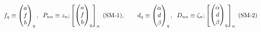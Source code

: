 \documentclass[preview]{standalone}
\begin{document}
\begin{align*}
\special{dvisvgm:raw <g id='unique000'>}f_q \equiv \begin{pmatrix} a \\ f \\ b \end{pmatrix}_q,\;\; P_{nn} \equiv z_n; \begin{bmatrix}\begin{pmatrix} a \\ f \\ b \end{pmatrix}_q\end{bmatrix}_n\;(\text{SM-1}), \qquad d_q \equiv \begin{pmatrix} \alpha \\ d \\ \beta \end{pmatrix}_q,\;\; D_{nn} \equiv \zeta_n; \begin{bmatrix}\begin{pmatrix} \alpha \\ d \\ \beta \end{pmatrix}_q\end{bmatrix}_n\;(\text{SM-2})\special{dvisvgm:raw </g>}
\end{align*}
\end{document}
